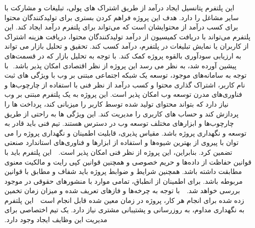 ‫
‫
‫این پلتفرم پتانسیل ایجاد درآمد از طریق اشتراک های پولی، تبلیغات و مشارکت با سایر مشاغل را دارد. هدف این پروژه فراهم کردن بستری برای تولیدکنندگان محتوا برای کسب درآمد از محتوایشان است که می‌تواند برای پلتفرم درآمد ایجاد کند. این پلتفرم می‌تواند با دریافت کمیسیون از درآمد تولیدکنندگان محتوا، دریافت هزینه اشتراک از کاربران یا نمایش تبلیغات در پلتفرم، درآمد کسب کند. تحقیق و تحلیل بازار می تواند به ارزیابی سودآوری بالقوه پروژه کمک کند. با توجه به تحلیل بازار که در قسمت‌های پیشین آورده شد، به نظر می رسد این پروژه از نظر اقتصادی امکان پذیر باشد.
‫
‫با توجه به سامانه‌های موجود، توسعه یک شبکه اجتماعی مبتنی بر وب با ویژگی های ثبت نام کاربر، اشتراک گذاری محتوا و کسب درآمد از نظر فنی با استفاده از چارچوب‌ها و فناوری‌های مدرن توسعه وب امکان پذیر است. این پروژه به یک پلتفرم مبتنی بر وب نیاز دارد که بتواند محتوای تولید شده توسط کاربر را میزبانی کند، پرداخت ها را پردازش کند و حساب های کاربری را مدیریت کند. این ویژگی ها به راحتی از طریق چارچوب‌ها و ابزارهای مختلف توسعه وب در دسترس هستند. تیم فنی باید قادر به توسعه و نگهداری پروژه باشد. مقیاس پذیری، قابلیت اطمینان و نگهداری پروژه را می توان با پیروی از بهترین شیوه‌ها و استفاده از ابزارها و فناوری‌های استاندارد صنعتی تضمین کرد. بنابراین، این پروژه از نظر فنی امکان پذیر است.
‫
‫
‫این پلتفرم باید با قوانین حفاظت از داده‌ها و حریم خصوصی و همچنین قوانین کپی رایت و مالکیت معنوی مطابقت داشته باشد. همچنین شرایط و ضوابط پروژه باید شفاف و مطابق با قوانین مربوطه باشد. برای اطمینان از انطباق، تمامی موارد با منشور‌های حقوقی در موجود بررسی خواهد شد.
‫
‫
‫با توجه به چرخه‌ها و فاز‌های تعریف شده و میزان زمان تخمین زده شده برای انجام هر کار، پروژه در زمان معین شده قابل انجام است
‫
‫
‫این پلتفرم به نگهداری مداوم، به روزرسانی و پشتیبانی مشتری نیاز دارد. یک تیم اختصاصی برای مدیریت این وظایف ایجاد وجود دارد.